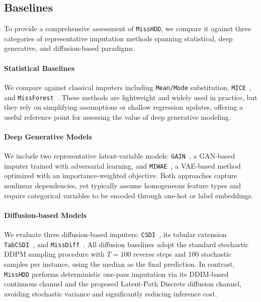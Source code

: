 \documentclass[times, review, 10pt]{elsarticle}
\begin{document}
\subsection{Baselines}

To provide a comprehensive assessment of \texttt{MissHDD}, we compare it against three categories of representative imputation methods spanning statistical, deep generative, and diffusion-based paradigms.

\paragraph{Statistical Baselines}
We compare against classical imputers including \texttt{Mean/Mode}
substitution, \texttt{MICE}~\cite{mice}, and \texttt{MissForest}~\cite{missforest}.
These methods are lightweight and widely used in practice, but they rely on
simplifying assumptions or shallow regression updates, offering a useful
reference point for assessing the value of deep generative modeling.

\paragraph{Deep Generative Models}
We include two representative latent-variable models: \texttt{GAIN}~\cite{yoon2018gain},
a GAN-based imputer trained with adversarial learning, and \texttt{MIWAE}~\cite{mattei2019miwae},
a VAE-based method optimized with an importance-weighted objective.
Both approaches capture nonlinear dependencies, yet typically assume
homogeneous feature types and require categorical variables to be encoded
through one-hot or label embeddings.

\paragraph{Diffusion-based Models}
We evaluate three diffusion-based imputers: \texttt{CSDI}~\cite{csdi}, its
tabular extension \texttt{TabCSDI}~\cite{tabcsdi}, and \texttt{MissDiff}~\cite{missdiff}.
All diffusion baselines adopt the standard stochastic DDPM sampling procedure
with $T{=}100$ reverse steps and 100 stochastic samples per instance, using
the median as the final prediction.  
In contrast, \texttt{MissHDD} performs deterministic one-pass imputation via
its DDIM-based continuous channel and the proposed Latent-Path Discrete
diffusion channel, avoiding stochastic variance and significantly reducing
inference cost.


\end{document}
